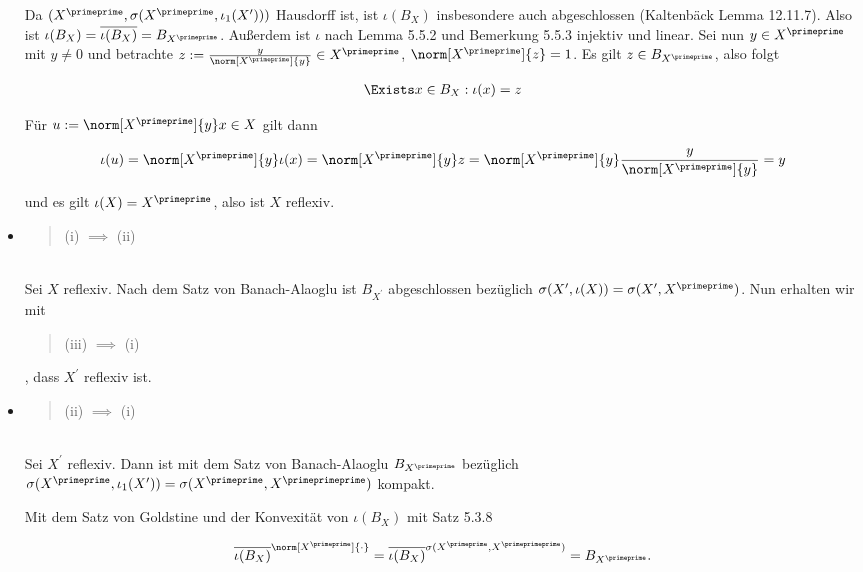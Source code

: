 \begin{solution}
\begin{itemize}

  Da $(X^\primeprime, \sigma(X^\primeprime, \iota_1(X^\prime)))$ Hausdorff ist, ist $\iota(B_X)$ insbesondere auch abgeschlossen (Kaltenbäck Lemma 12.11.7).
  Also ist $\iota(B_X) = \overline{\iota(B_X)} = B_{X^\primeprime}$.
  Außerdem ist $\iota$ nach Lemma 5.5.2 und Bemerkung 5.5.3 injektiv und linear.
  Sei nun $y \in X^\primeprime$ mit $y \neq 0$ und betrachte $z := \frac{y}{\norm[X^\primeprime]{y}} \in X^\primeprime$, $\norm[X^\primeprime]{z} = 1$.
  Es gilt $z \in B_{X^\primeprime}$, also folgt

  \begin{align*}
    \Exists x \in B_X:
    \iota(x) = z
  \end{align*}

  Für $u := \norm[X^\primeprime]{y} x \in X$ gilt dann

  \begin{align*}
    \iota(u)
    =
    \norm[X^\primeprime]{y} \iota(x)
    =
    \norm[X^\primeprime]{y} z
    =
    \norm[X^\primeprime]{y} \frac{y}{\norm[X^\primeprime]{y}}
    = y
  \end{align*}

  und es gilt $\iota(X) = X^\primeprime$, also ist $X$ reflexiv.

  \item
  \blockquote{(i) $\implies$ (ii)}: \\

  Sei $X$ reflexiv.
  Nach dem Satz von Banach-Alaoglu ist $B_{X^\prime}$ abgeschlossen bezüglich $\sigma(X^\prime, \iota(X)) = \sigma(X^\prime, X^\primeprime)$.
  Nun erhalten wir mit \blockquote{(iii) $\implies$ (i)}, dass $X^\prime$ reflexiv ist.

  \item
  \blockquote{(ii) $\implies$ (i)}: \\

  Sei $X^\prime$ reflexiv.
  Dann ist mit dem Satz von Banach-Alaoglu $B_{X^\primeprime}$ bezüglich $\sigma(X^\primeprime, \iota_1(X^\prime)) = \sigma(X^\primeprime, X^\primeprimeprime)$ kompakt.


  Mit dem Satz von Goldstine und der Konvexität von $\iota(B_X)$ mit Satz 5.3.8

  \begin{align*}
    \overline{\iota(B_X)}^{\norm[X^\primeprime]{\cdot}}
    =
    \overline{\iota(B_X)}^{\sigma(X^\primeprime, X^\primeprimeprime)}
    =
    B_{X^\primeprime}.
  \end{align*}


\end{itemize}
\end{solution}

